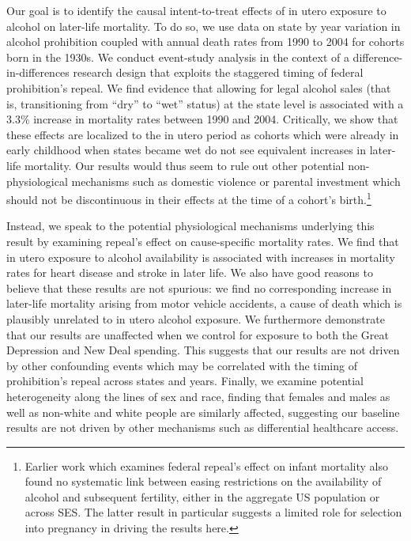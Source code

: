 \documentclass[12pt]{article}
\begin{document}
Our goal is to identify the causal intent-to-treat effects of in utero exposure to alcohol on later-life mortality. 
To do so, we use data on state by year variation in alcohol prohibition coupled with annual death rates from 1990 to 2004 for cohorts born in the 1930s. 
We conduct event-study analysis in the context of a difference-in-differences research design that exploits the staggered timing of federal prohibition's repeal. 
We find evidence that allowing for legal alcohol sales (that is, transitioning from ``dry'' to ``wet'' status) at the state level is associated with a 3.3\% increase in mortality rates between 1990 and 2004. 
Critically, we show that these effects are localized to the in utero period as cohorts which were already in early childhood when states became wet do not see equivalent increases in later-life mortality.
Our results would thus seem to rule out other potential non-physiological mechanisms such as domestic violence or parental investment which should not be discontinuous in their effects at the time of a cohort's birth.\footnote{Earlier work which examines federal repeal's effect on infant mortality  also found no systematic link between easing restrictions on the availability of alcohol and subsequent fertility, either in the aggregate US population or across SES. The latter result in particular suggests a limited role for selection into pregnancy in driving the results here.}

Instead, we speak to the potential physiological mechanisms underlying this result by examining repeal's effect on cause-specific mortality rates. 
We find that in utero exposure to alcohol availability is associated with increases in mortality rates for heart disease and stroke in later life. 
We also have good reasons to believe that these results are not spurious: we find no corresponding increase in later-life mortality arising from motor vehicle accidents, a cause of death which is plausibly unrelated to in utero alcohol exposure. 
We furthermore demonstrate that our results are unaffected when we control for exposure to both the Great Depression and New Deal spending. 
This suggests that our results are not driven by other confounding events which may be correlated with the timing of prohibition's repeal across states and years. 
Finally, we examine potential heterogeneity along the lines of sex and race, finding that females and males as well as non-white and white people are similarly affected, suggesting our baseline results are not driven by other mechanisms such as differential healthcare access. 
\end{document}
